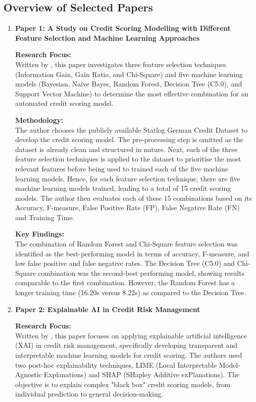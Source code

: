 \documentclass[12pt,a4paper]{article}
\begin{document}
\subsection{Overview of Selected Papers}
\begin{enumerate}
    \item \textbf{Paper 1: A Study on Credit Scoring Modelling with Different Feature Selection and Machine Learning Approaches } 

    \textbf{Research Focus:}\\
    Written by \cite{TRIVEDI2020101413}, this paper investigates three feature selection techniques (Information Gain, Gain Ratio, and Chi-Square) and five machine learning models (Bayesian, Naïve Bayes, Random Forest, Decision Tree (C5.0), and Support Vector Machine) to determine the most effective combination for an automated credit scoring model.
    
    \textbf{Methodology:}\\
    The author chooses the publicly available Statlog German Credit Dataset to develop the credit scoring model. The pre-processing step is omitted as the dataset is already clean and structured in nature. Next, each of the three feature selection techniques is applied to the dataset to prioritise the most relevant features before being used to trained each of the five machine learning models. Hence, for each feature selection technique, there are five machine learning models trained, leading to a total of 15 credit scoring models. The author then evaluates each of these 15 combinations based on its Accuracy, F-measure, False Positive Rate (FP), False Negative Rate (FN) and Training Time.
    
    \textbf{Key Findings:}\\
    The combination of Random Forest and Chi-Square feature selection was identified as the best-performing model in terms of accuracy, F-measure, and low false positive and false negative rates. The Decision Tree (C5.0) and Chi-Square combination was the second-best performing model, showing results comparable to the first combination. However, the Random Forest has a longer training time (16.20s versus 8.22s) as compared to the Decision Tree.
    
    \newpage
    
    \item \textbf{Paper 2: Explainable AI in Credit Risk Management} 
    
    \textbf{Research Focus:}\\
    Written by \cite{misheva2021explainable}, this paper focuses on applying explainable artificial intelligence (XAI) in credit risk management, specifically developing transparent and interpretable machine learning models for credit scoring. The authors used two post-hoc explainability techniques, LIME (Local Interpretable Model-Agnostic Explanations) and SHAP (SHapley Additive exPlanations). The objective is to explain complex "black box" credit scoring models, from individual prediction to general decision-making.
    

\end{enumerate}
\end{document}
